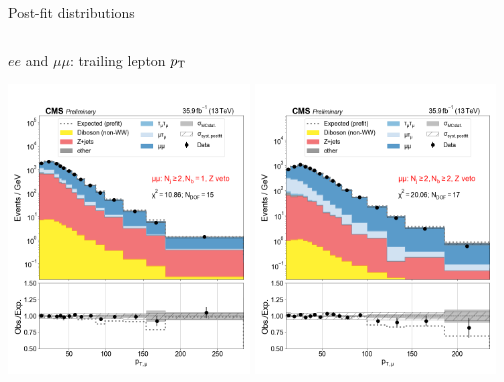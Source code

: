\begin{frame}{Post-fit distributions}
\begin{columns}
\begin{tcolorbox}{\smaller $ee$ and $\mu\mu$: trailing lepton $p_{\mathrm{T}}$}
\begin{center}
                \includegraphics[width=0.48\textwidth]{chapters/Analysis/sectionStatisticalAnalysis/figures/fit/mumu_cat_gt2_eq1_b}
                \includegraphics[width=0.48\textwidth]{chapters/Analysis/sectionStatisticalAnalysis/figures/fit/mumu_cat_gt2_gt2_b}
            \end{center}
        \end{tcolorbox}{}


\end{columns}
\end{frame}

